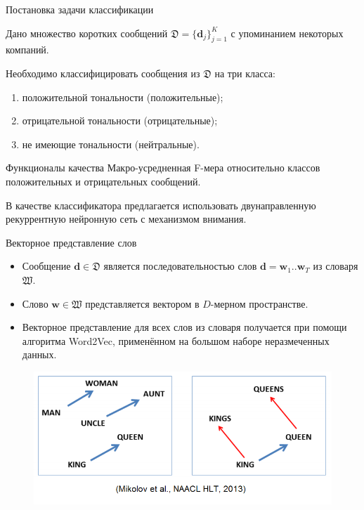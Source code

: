 \documentclass{beamer}
\begin{document}
\begin{frame}{Постановка задачи классификации}
	\begin{block}{}
        Дано множество коротких сообщений $\mathfrak{D} = \{\mathbf{d}_j\}_{j=1}^{K}$ с упоминанием некоторых компаний.
	\end{block}    
    
    \begin{block}{}
        Необходимо классифицировать сообщения из $\mathfrak{D}$ на три класса:
        	\begin{enumerate}
			\item положительной тональности (положительные);
			\item отрицательной тональности (отрицательные);
			\item не имеющие тональности (нейтральные).
			\end{enumerate}
	\end{block}
	
	\begin{block}{Функционалы качества}
		Макро-усредненная F-мера
относительно классов положительных и
отрицательных сообщений.
	\end{block}
	В качестве классификатора предлагается использовать двунаправленную рекуррентную нейронную сеть с механизмом внимания.
\end{frame}
\begin{frame}{Векторное представление слов}
	\begin{itemize}
	\item Сообщение $\mathbf{d}\in\mathfrak{D}$ является последовательностью слов $\mathbf{d}=\mathbf{w}_1..\mathbf{w}_T$ из словаря $\mathfrak{W}$.\\
	\item Слово $\mathbf{w}\in\mathfrak{W}$ представляется вектором в $D$-мерном пространстве.\\
	\item Векторное представление для всех слов из словаря получается при помощи алгоритма Word2Vec, применённом на большом наборе неразмеченных данных.
	\end{itemize}
\begin{figure}[!h]
  \includegraphics[width=1.0\textwidth]{images/word2vec.png}
\end{figure}
\end{frame}
\end{document}
